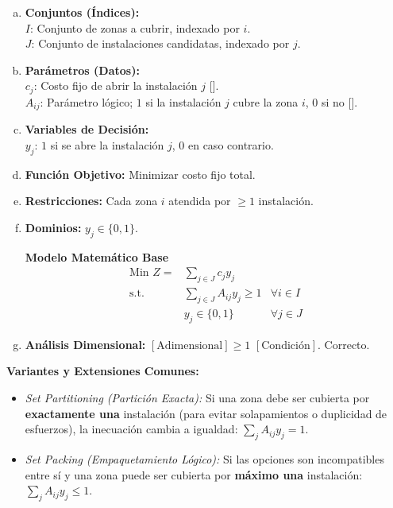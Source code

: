 \documentclass{article}
\begin{document}
	\begin{enumerate}[a)]
		\item \textbf{Conjuntos (Índices):}\\
		$I$: Conjunto de zonas a cubrir, indexado por $i$.\\
		$J$: Conjunto de instalaciones candidatas, indexado por $j$.
		
		\item \textbf{Parámetros (Datos):}\\
		$c_j$: Costo fijo de abrir la instalación $j$ [\text{\$}].\\
		$A_{ij}$: Parámetro lógico; $1$ si la instalación $j$ cubre la zona $i$, $0$ si no [].
		
		\item \textbf{Variables de Decisión:}\\
		$y_j$: $1$ si se abre la instalación $j$, $0$ en caso contrario.
		\item \textbf{Función Objetivo:} Minimizar costo fijo total.
		\item \textbf{Restricciones:} Cada zona $i$ atendida por $\geq 1$ instalación.
		\item \textbf{Dominios:} $y_j \in \{0, 1\}$.
		
		\begin{center}
			\textbf{Modelo Matemático Base}
			$$\begin{aligned}
				\text{Min } Z = & \sum_{j \in J} c_j y_j \\
				\text{s.t.} \quad & \sum_{j \in J} A_{ij} y_j \geq 1 & \forall i \in I \\
				& y_j \in \{0, 1\} & \forall j \in J
			\end{aligned}$$
		\end{center}
		
		\item \textbf{Análisis Dimensional:} $[\text{Adimensional}] \geq 1$ $[\text{Condición}]$. Correcto.
	\end{enumerate}
	
	\textbf{Variantes y Extensiones Comunes:}
	\begin{itemize}
		\item \textit{Set Partitioning (Partición Exacta):} Si una zona debe ser cubierta por \textbf{exactamente una} instalación (para evitar solapamientos o duplicidad de esfuerzos), la inecuación cambia a igualdad: $\sum_{j} A_{ij} y_j = 1$.
		\item \textit{Set Packing (Empaquetamiento Lógico):} Si las opciones son incompatibles entre sí y una zona puede ser cubierta por \textbf{máximo una} instalación: $\sum_{j} A_{ij} y_j \leq 1$.
	\end{itemize}
	
\end{document}
